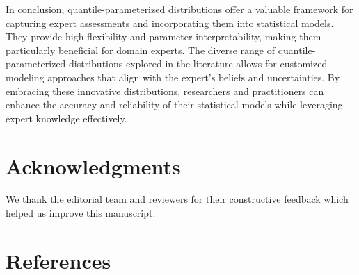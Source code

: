\documentclass[
  fleqn,
  deca,
  blindrev
]{informs4}
\begin{document}
In conclusion, quantile-parameterized distributions offer a valuable
framework for capturing expert assessments and incorporating them into
statistical models. They provide high flexibility and parameter
interpretability, making them particularly beneficial for domain
experts. The diverse range of quantile-parameterized distributions
explored in the literature allows for customized modeling approaches
that align with the expert's beliefs and uncertainties. By embracing
these innovative distributions, researchers and practitioners can
enhance the accuracy and reliability of their statistical models while
leveraging expert knowledge effectively.

\section*{Acknowledgments}\label{acknowledgments}

We thank the editorial team and reviewers for their constructive
feedback which helped us improve this manuscript.

\section*{References}\label{references}

\renewcommand{\bibsection}{}

\end{document}

